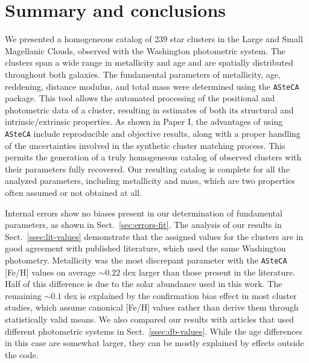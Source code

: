 \documentclass{aa}
\begin{document}

\section{Summary and conclusions}
\label{sec:summ-concl}

We presented a homogeneous catalog of 239 star clusters in the Large and Small
Magellanic Clouds, observed with the Washington photometric system. The clusters
span a wide range in metallicity and age and are spatially distributed
throughout both galaxies.
%
The fundamental parameters of metallicity, age, reddening, distance modulus, and
total mass were determined using the \texttt{ASteCA} package.
%
This tool allows the automated processing of the positional and photometric data
of a cluster, resulting in estimates of both its structural and
intrinsic/extrinsic properties.
%
As shown in Paper I, the advantages of using \texttt{ASteCA} include
reproducible and objective results, along with a proper handling of the
uncertainties involved in the synthetic cluster matching process.
%
This permits the generation of a truly homogeneous catalog of observed
clusters with their parameters fully recovered.
%
Our resulting catalog is complete for all the analyzed parameters, including
metallicity and mass, which are two properties often assumed or not obtained at all.

Internal errors show no biases present in our determination of fundamental
parameters, as shown in Sect.~\ref{sec:errors-fit}.
%
The analysis of our results in Sect.~\ref{ssec:lit-values} demonstrate that the
assigned values for the clusters are in good agreement with published literature,
which used the same Washington photometry.
%
Metallicity was the most discrepant parameter with the \texttt{ASteCA}
[Fe/H] values on average ${\sim}0.22$ dex larger than those present in the
literature. Half of this difference is due to the solar abundance used in
this work. The remaining ${\sim}0.1$ dex is explained by the confirmation
bias effect in most cluster studies, which assume canonical [Fe/H]
values rather than derive them through statistically valid means.
%
We also compared our results with articles that used different photometric
systems in Sect.~\ref{ssec:db-values}. While the age differences in
this case are somewhat larger, they can be mostly explained by effects outside
the code.
\end{document}
